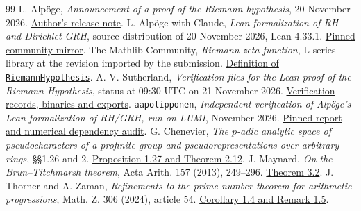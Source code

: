 \documentclass[11pt,a4paper]{article}
\theoremstyle{definition}
\theoremstyle{remark}
\numberwithin{equation}{section}
\begin{document}
\begin{thebibliography}{99}
 L. Alpöge, \emph{Announcement of a proof of the Riemann hypothesis}, 20 November 2026. \href{https://alpo.ge/remark.pdf}{Author's release note}.
 L. Alpöge with Claude, \emph{Lean formalization of RH and Dirichlet GRH}, source distribution of 20 November 2026, Lean 4.33.1. \href{https://github.com/leanprover-community/riemann-hypothesis/tree/40e56bab026552e089d7afcfeff08d2defb9c005}{Pinned community mirror}.
 The Mathlib Community, \emph{Riemann zeta function}, L-series library at the revision imported by the submission. \href{https://github.com/leanprover-community/mathlib4/blob/0df444a360eaa60ab8c11dca51a86af692955474/Mathlib/NumberTheory/LSeries/RiemannZeta.lean\#L162}{Definition of \texttt{RiemannHypothesis}}.
 A. V. Sutherland, \emph{Verification files for the Lean proof of the Riemann Hypothesis}, status at 09:30 UTC on 21 November 2026. \href{https://math.mit.edu/~drew/grh/}{Verification records, binaries and exports}.
 \texttt{aapolipponen}, \emph{Independent verification of Alpöge's Lean formalization of RH/GRH, run on LUMI}, November 2026. \href{https://github.com/aapolipponen/rh-lean-check-lumi/tree/82d91dbbd04d71f2cb45c3f2898f421b91c1c9d7}{Pinned report and numerical dependency audit}.
 G. Chenevier, \emph{The \(p\)-adic analytic space of pseudocharacters of a profinite group and pseudorepresentations over arbitrary rings}, §§1.26 and 2. \href{https://arxiv.org/pdf/0809.0415}{Proposition 1.27 and Theorem 2.12}.
 J. Maynard, \emph{On the Brun--Titchmarsh theorem}, Acta Arith. 157 (2013), 249--296. \href{https://doi.org/10.4064/aa157-3-3}{Theorem 3.2}.
 J. Thorner and A. Zaman, \emph{Refinements to the prime number theorem for arithmetic progressions}, Math. Z. 306 (2024), article 54. \href{https://arxiv.org/pdf/2108.10878}{Corollary 1.4 and Remark 1.5}.

\end{thebibliography}
\end{document}

